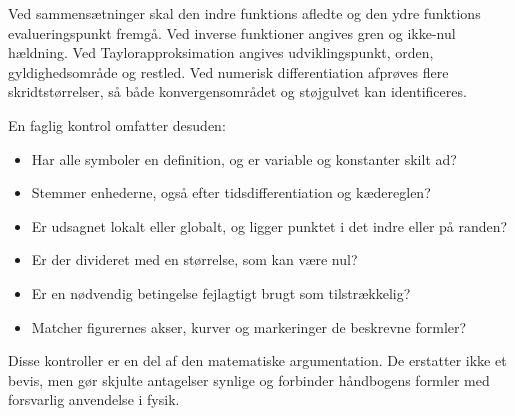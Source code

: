 Ved sammensætninger skal den indre funktions afledte og den ydre funktions evalueringspunkt fremgå. Ved inverse funktioner angives gren og ikke-nul hældning. Ved Taylorapproksimation angives udviklingspunkt, orden, gyldighedsområde og restled. Ved numerisk differentiation afprøves flere skridtstørrelser, så både konvergensområdet og støjgulvet kan identificeres.

En faglig kontrol omfatter desuden:
\begin{itemize}
\item Har alle symboler en definition, og er variable og konstanter skilt ad?
\item Stemmer enhederne, også efter tidsdifferentiation og kædereglen?
\item Er udsagnet lokalt eller globalt, og ligger punktet i det indre eller på randen?
\item Er der divideret med en størrelse, som kan være nul?
\item Er en nødvendig betingelse fejlagtigt brugt som tilstrækkelig?
\item Matcher figurernes akser, kurver og markeringer de beskrevne formler?
\end{itemize}
Disse kontroller er en del af den matematiske argumentation. De erstatter ikke et bevis, men gør skjulte antagelser synlige og forbinder håndbogens formler med forsvarlig anvendelse i fysik.
